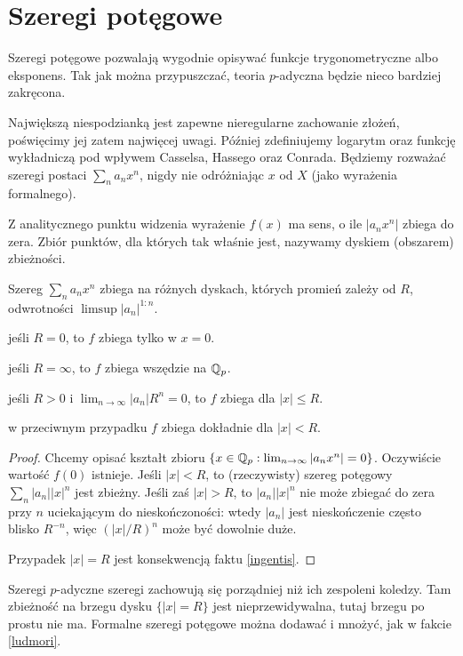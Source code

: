 \section{Szeregi potęgowe}
Szeregi  potęgowe pozwalają wygodnie opisywać funkcje trygonometryczne albo eksponens.
Tak jak można przypuszczać, teoria $p$-adyczna będzie nieco bardziej zakręcona.

Największą niespodzianką jest zapewne nieregularne zachowanie złożeń, poświęcimy jej zatem najwięcej uwagi.
Później zdefiniujemy logarytm oraz funkcję wykładniczą pod wpływem Casselsa, Hassego oraz Conrada.
Będziemy rozważać szeregi postaci $\sum_n a_n x^n$, nigdy nie odróżniając $x$ od $X$ (jako wyrażenia formalnego).

Z analitycznego punktu widzenia wyrażenie $f(x)$ ma sens, o ile $|a_n x^n|$ zbiega do zera.
Zbiór punktów, dla których tak właśnie jest, nazywamy dyskiem (obszarem) zbieżności.

\begin{fakt} \label{causeahriot}
	Szereg $\sum_n a_n x^n$ zbiega na różnych dyskach, których promień zależy od $R$, odwrotności $\limsup |a_n|^{1:n}$.
	\begin{enumx}
	\item jeśli $R = 0$, to $f$ zbiega tylko w $x = 0$.
	\item jeśli $R = \infty$, to $f$ zbiega wszędzie na $\mathbb Q_p$.
	\item jeśli $R > 0$ i $\lim_{n \to \infty} |a_n| R^n = 0$, to $f$ zbiega dla $|x| \le R$.
	\item w przeciwnym przypadku $f$ zbiega dokładnie dla $|x| < R$.
	\end{enumx}
\end{fakt}

\begin{proof}
	Chcemy opisać kształt zbioru $\{x \in \mathbb Q_p : \lim_{n \to \infty} |a_n x^n| = 0\}$.
	Oczywiście wartość $f(0)$ istnieje.
	Jeśli $|x| < R $, to (rzeczywisty) szereg potęgowy $\sum_n |a_n| |x|^n$ jest zbieżny.
	Jeśli zaś $|x| > R $, to $|a_n| |x|^n$ nie może zbiegać do zera przy $n$ uciekającym do nieskończoności: wtedy $|a_n|$ jest nieskończenie często blisko $R ^{-n}$, więc $(|x|/R )^n$ może być dowolnie duże.
	
	Przypadek $|x| = R $ jest konsekwencją faktu \ref{ingentis}.
\end{proof}

Szeregi $p$-adyczne szeregi zachowują się porządniej niż ich zespoleni koledzy.
Tam zbieżność na brzegu dysku $\{|x| = R \}$ jest nieprzewidywalna, tutaj brzegu po prostu nie ma.
Formalne szeregi potęgowe można dodawać i mnożyć, jak w fakcie \ref{ludmori}.


